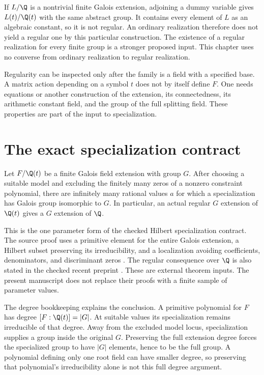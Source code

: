 If \(L/\Q\) is a nontrivial finite Galois extension, adjoining a dummy variable gives \(L(t)/\Q(t)\) with the same abstract group. It contains every element of \(L\) as an algebraic constant, so it is not regular. An ordinary realization therefore does not yield a regular one by this particular construction. The existence of a regular realization for every finite group is a stronger proposed input. This chapter uses no converse from ordinary realization to regular realization.

Regularity can be inspected only after the family is a field with a specified base. A matrix action depending on a symbol \(t\) does not by itself define \(F\). One needs equations or another construction of the extension, its connectedness, its arithmetic constant field, and the group of the full splitting field. These properties are part of the input to specialization.

\section{The exact specialization contract}

\begin{theorem}
\label{thm:b-hilbert-specialization}
Let \(F/\Q(t)\) be a finite Galois field extension with group \(G\). After choosing a suitable model and excluding the finitely many zeros of a nonzero constraint polynomial, there are infinitely many rational values \(a\) for which a specialization has Galois group isomorphic to \(G\). In particular, an actual regular \(G\) extension of \(\Q(t)\) gives a \(G\) extension of \(\Q\).
\end{theorem}

This is the one parameter form of the checked Hilbert specialization contract. The source proof uses a primitive element for the entire Galois extension, a Hilbert subset preserving its irreducibility, and a localization avoiding coefficients, denominators, and discriminant zeros \cite[Theorem 2.6.3, Theorem 5.2.4 and Proposition 5.2.14]{DebesLectureNotes}. The regular consequence over \(\Q\) is also stated in the checked recent preprint \cite[Section 1.2]{HuangEtAl2026}. These are external theorem inputs. The present manuscript does not replace their proofs with a finite sample of parameter values.

The degree bookkeeping explains the conclusion. A primitive polynomial for \(F\) has degree \([F:\Q(t)]=|G|\). At suitable values its specialization remains irreducible of that degree. Away from the excluded model locus, specialization supplies a group inside the original \(G\). Preserving the full extension degree forces the specialized group to have \(|G|\) elements, hence to be the full group. A polynomial defining only one root field can have smaller degree, so preserving that polynomial's irreducibility alone is not this full degree argument.


